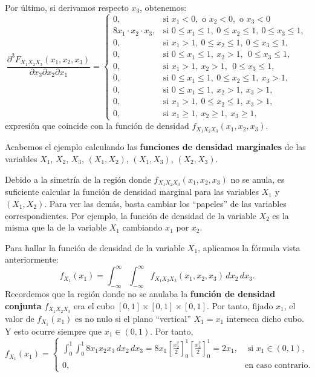 \documentclass[]{book}
\begin{document}
Por último, si derivamos respecto \(x_3\), obtenemos:
\[
\frac{\partial^3 F_{X_1X_2X_3}(x_1,x_2,x_3)}{\partial x_3\partial x_2\partial x_1}=\begin{cases}
0, & \mbox{si }x_1<0,\mbox{ o }x_2<0,\mbox{ o }x_3 <0\\
8 x_1\cdot x_2\cdot x_3, & \mbox{si }0\leq x_1\leq 1,\ 0\leq x_2\leq 1,\ 0\leq x_3\leq 1, \\
 0, & \mbox{si }x_1> 1,\ 0\leq x_2\leq  1,\ 0\leq x_3\leq  1, \\
 0, & \mbox{si }0\leq x_1\leq  1,\ x_2> 1,\ \ 0\leq x_3\leq  1, \\
 0, & \mbox{si }x_1> 1,\ x_2> 1,\ \ 0\leq x_3\leq  1, \\
 0, & \mbox{si }0\leq x_1\leq  1,\ 0\leq x_2\leq  1,\ x_3> 1,\\
 0, & \mbox{si }0\leq x_1\leq  1,\ x_2 >  1,\ x_3> 1,\\
 0, & \mbox{si }x_1>1,\ 0\leq x_2\leq  1,\ x_3> 1,\\
0, & \mbox{si }x_1\geq 1,\ x_2\geq 1,\ x_3\geq 1,
\end{cases}
\]
expresión que coincide con la función de densidad \(f_{X_1X_2X_3}(x_1,x_2,x_3)\).

Acabemos el ejemplo calculando las \textbf{funciones de densidad marginales} de las variables \(X_1\), \(X_2\), \(X_3\), \((X_1,X_2)\), \((X_1,X_3)\), \((X_2,X_3)\).

Debido a la simetría de la región donde \(f_{X_1X_2X_3}(x_1,x_2,x_3)\) no se anula, es suficiente calcular la función de densidad marginal para las variables \(X_1\) y \((X_1,X_2)\). Para ver las demás, basta cambiar los ``papeles'' de las variables correspondientes. Por ejemplo, la función de densidad de la variable \(X_2\) es la misma que la de la variable \(X_1\) cambiando \(x_1\) por \(x_2\).

Para hallar la función de densidad de la variable \(X_1\), aplicamos la fórmula vista anteriormente:
\[
f_{X_1}(x_1)=\int_{-\infty}^\infty\int_{-\infty}^\infty  f_{X_1X_2X_3}(x_1,x_2,x_3)\, dx_2\, dx_3.
\]
Recordemos que la región donde no se anulaba la \textbf{función de densidad conjunta} \(f_{X_1X_2X_3}\) era el cubo \([0,1]\times [0,1]\times [0,1]\). Por tanto, fijado \(x_1\), el valor de \(f_{X_1}(x_1)\) es no nulo si el plano ``vertical'' \(X_1=x_1\) interseca dicho cubo. Y esto ocurre siempre que \(x_1\in (0,1)\). Por tanto,
\[
f_{X_1}(x_1)=\begin{cases}
\int_{0}^1\int_0^1 8 x_1x_2 x_3  \, dx_2\, dx_3=8x_1\left[\frac{x_2^2}{2}\right]_0^1 \left[\frac{x_3^2}{2}\right]_0^1 =2 x_1, & \mbox{ si }x_1\in (0,1),\\
0, & \mbox{en caso contrario.}
\end{cases}
\]
\end{document}
